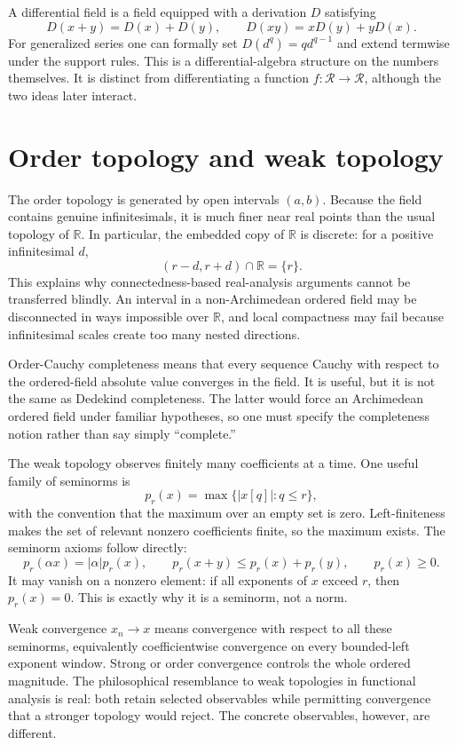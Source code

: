 \documentclass[11pt,a4paper]{article}
\theoremstyle{remark}
\newcommand{\LC}{\mathcal R}
\newcommand{\R}{\mathbb R}
\begin{document}
A differential field is a field equipped with a derivation $D$ satisfying
\[
D(x+y)=D(x)+D(y),\qquad D(xy)=xD(y)+yD(x).
\]
For generalized series one can formally set $D(d^q)=q d^{q-1}$ and extend termwise under the
support rules. This is a differential-algebra structure on the numbers themselves. It is distinct
from differentiating a function $f:\LC\to\LC$, although the two ideas later interact.

\section{Order topology and weak topology}

The order topology is generated by open intervals $(a,b)$. Because the field contains genuine
infinitesimals, it is much finer near real points than the usual topology of $\R$. In particular,
the embedded copy of $\R$ is discrete: for a positive infinitesimal $d$,
\[
(r-d,r+d)\cap\R=\{r\}.
\]
This explains why connectedness-based real-analysis arguments cannot be transferred blindly.
An interval in a non-Archimedean ordered field may be disconnected in ways impossible over $\R$,
and local compactness may fail because infinitesimal scales create too many nested directions.

Order-Cauchy completeness means that every sequence Cauchy with respect to the ordered-field
absolute value converges in the field. It is useful, but it is not the same as Dedekind
completeness. The latter would force an Archimedean ordered field under familiar hypotheses, so
one must specify the completeness notion rather than say simply ``complete.''

The weak topology observes finitely many coefficients at a time. One useful family of seminorms
is
\[
p_r(x)=\max\{|x[q]|:q\le r\},
\]
with the convention that the maximum over an empty set is zero. Left-finiteness makes the set of
relevant nonzero coefficients finite, so the maximum exists. The seminorm axioms follow directly:
\[
p_r(\alpha x)=|\alpha|p_r(x),\qquad
p_r(x+y)\le p_r(x)+p_r(y),\qquad p_r(x)\ge0.
\]
It may vanish on a nonzero element: if all exponents of $x$ exceed $r$, then $p_r(x)=0$. This is
exactly why it is a seminorm, not a norm.

Weak convergence $x_n\to x$ means convergence with respect to all these seminorms, equivalently
coefficientwise convergence on every bounded-left exponent window. Strong or order convergence
controls the whole ordered magnitude. The philosophical resemblance to weak topologies in
functional analysis is real: both retain selected observables while permitting convergence that
a stronger topology would reject. The concrete observables, however, are different.
\end{document}
